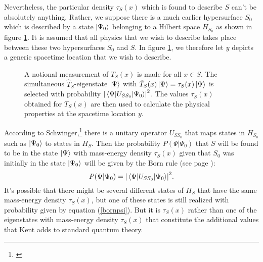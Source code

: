 Nevertheless, the particular density $\tau_S(x)$ which is found to describe $S$ can't be absolutely anything. Rather, we suppose there is a much earlier hypersurface $S_0$ which is described by a state $\ket{\Psi_0}$ belonging to a Hilbert space $H_{S_0}$ as shown in figure \ref{S1}.  It is assumed that all physics that we wish to describe takes place between these two hypersurfaces $S_0$ and $S$. In figure \ref{S1}, we therefore let $y$ depicts a generic spacetime location that we wish to describe. 
 \begin{figure}[ht!]
\captionsetup{justification=justified}
\centering



\vspace*{2px}
\caption{A notional measurement of $T_S(x)$ is made for all $x\in S$. The simultaneous  $\hat{T}_S$-eigenstate $\ket{\Psi}$ with $\hat{T}_S(x)\ket{\Psi}=\tau_S(x)\ket{\Psi}$ is selected with probability $\abs{\mel{\Psi}{U_{SS_0}}{\Psi_0}}^2$. The values $\tau_S(x)$ obtained for $T_S(x)$ are then used to calculate the physical properties at the spacetime location $y$.  }
\label{S1}
\end{figure} 
\vspace*{-12px}

 According to Schwinger,\footnote{\cite[p.1459]{SchwingerJulianI}} there is a unitary operator\label{SchwingerUnitaryOP}  $U_{SS_0}$ that maps states in $H_{S_0}$ such as $\ket{\Psi_0}$ to states in $H_S$. Then the probability $P(\Psi|\Psi_0)$ that  $S$ will be found to be in the state $\ket{\Psi}$ with mass-energy density $\tau_S(x)$ given that $S_0$ was initially in the state $\ket{\Psi_0}$ will be given by the Born rule (see page \pageref{bornrule}):
 \begin{equation}\label{bornpsi}
 P(\Psi|\Psi_0) = \abs{\mel{\Psi}{U_{SS_0}}{\Psi_0}}^2.
 \end{equation}
It's possible that there might be several different states of $H_S$ that have the same mass-energy density $\tau_S(x)$, but one of these states is still realized with probability given by equation (\ref{bornpsi}). But it is $\tau_S(x)$ rather than one of the eigenstates with mass-energy density $\tau_S(x)$ that constitute the additional values that Kent adds to standard quantum theory. 


